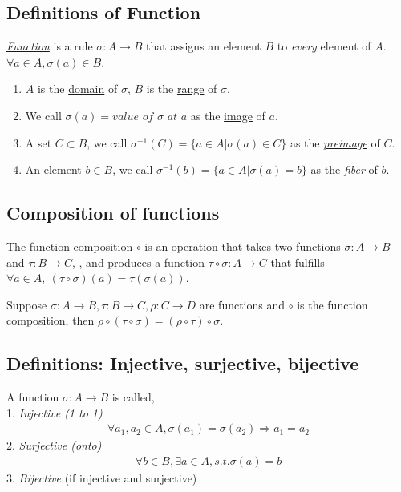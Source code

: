 \documentclass[11pt]{elegantbook}
\begin{document}
\subsection{Definitions of Function}
\begin{definition}[Function]
\normalfont
\underline{\textit{Function}} is a rule $\sigma:A\rightarrow B$ that assigns an element $B$ to \textit{every} element of $A$. $\forall a\in A, \sigma(a)\in B$.
\begin{enumerate}
    \item $A$ is the \underline{domain} of $\sigma$, $B$ is the \underline{range} of $\sigma$.
    \item We call $\sigma (a)= \textit{value of } \sigma\textit{ at } a$ as the \underline{image} of $a$.
    \item A set $C\subset B$, we call $\sigma^{-1}(C)=\{a\in A| \sigma(a)\in C\}$ as the \textit{\underline{preimage}} of $C$.
    \item An element $b\in B$, we call $\sigma^{-1}(b)=\{a\in A| \sigma(a)=b \}$ as the \textit{\underline{fiber}} of $b$.
\end{enumerate}
\end{definition}

\subsection{Composition of functions}
\begin{definition}
\normalfont
The function composition $\circ$ is an operation that takes two functions $\sigma: A\rightarrow B$ and $\tau: B\rightarrow C$, , and produces a function $\tau\circ \sigma:A\rightarrow C$ that fulfills $\forall a\in A,\ (\tau\circ \sigma)(a)=\tau( \sigma(a))$.
\end{definition}

\begin{proposition}
    Suppose $\sigma:A \rightarrow B, \tau:B \rightarrow C, \rho:C \rightarrow D$ are functions and $\circ$ is the function composition, then $\rho\circ(\tau\circ\sigma)=(\rho\circ\tau)\circ\sigma$.
\end{proposition}
\subsection{Definitions: Injective, surjective, bijective}
A function $\sigma:A \rightarrow B$ is called,\\
1. \textit{Injective (1 to 1)}
\begin{equation}
    \begin{aligned}
        \forall a_1,a_2\in A, \sigma(a_1)=\sigma(a_2)\Rightarrow a_1=a_2
    \end{aligned}
    \nonumber
\end{equation}
2. \textit{Surjective (onto)}
\begin{equation}
    \begin{aligned}
        \forall b\in B,\exists a\in A, s.t. \sigma(a)=b
    \end{aligned}
    \nonumber
\end{equation}
3. \textit{Bijective} (if injective and surjective)
\end{document}
